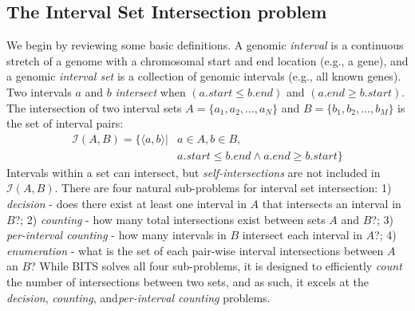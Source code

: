 \documentclass{bioinfo}
\begin{document}
\subsection{The Interval Set Intersection problem}
We begin by reviewing some basic definitions.  A genomic \emph{interval} is a 
continuous stretch of a genome with a chromosomal start and end location 
(e.g., a gene), and a genomic \emph{interval set} is a collection of genomic 
intervals (e.g., all known genes).  
Two intervals $a$ and $b$ {\em intersect} when 
$(a.start \leq b.end)$ and $(a.end \geq b.start)$.  The intersection of two
interval sets $A=\{a_1, a_2, \dots, a_N\}$ and $B=\{b_1, b_2, \dots, b_M\}$ is
the set of interval pairs:
\vspace{-.75em}
\begin{equation*}
	\begin{split}
		\mathcal{I}(A,B)= \{ \langle a,b \rangle |& a \in A, b \in B, \\
		& a.start \leq b.end \wedge a.end \geq b.start\}
	\end{split}
\end{equation*}
Intervals within a set can intersect, but {\em self-intersections} are not
included in $\mathcal{I}(A,B)$.  
There are four natural sub-problems for interval set intersection: 1) 
\emph{decision} - does there exist at least one 
interval in $A$ that intersects an interval in $B$?; 2) {\em counting} - how 
many total intersections exist between sets $A$ and $B$?; 3) {\em 
per-interval counting} - how many intervals in $B$ intersect each interval in 
$A$?; 4) {\em enumeration} - what is the set of each pair-wise interval 
intersections between $A$ an $B$? While BITS solves all 
four sub-problems, it is designed to efficiently \emph{count} the number of 
intersections between two sets, and as such, it excels at the \emph{decision}, 
\emph{counting}, and\emph{per-interval counting} problems.

% 
% 
% 
\end{document}

